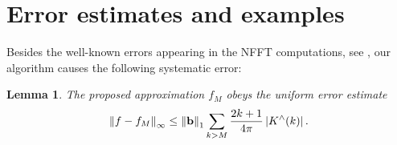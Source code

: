 \documentclass[11pt,a4paper,twoside,bibtotoc]{scrartcl}
\theoremstyle{plain}
\newtheorem{lemma}[theorem]{Lemma}
\theoremstyle{definition}
\theoremstyle{remark}
\newcommand{\abs}[1]{\ensuremath{\left\vert#1\right\vert}}
\newcommand{\fun}[2]{\ensuremath{#1{\hspace{-0.4ex}}\left(#2\right)}}
\newcommand{\mb}[1]{\mathbf{#1}}
\newcommand{\V}[1]{\mb{#1}}
\numberwithin{equation}{section}
\numberwithin{table}{section}
\numberwithin{figure}{section}
\begin{document}
\section{Error estimates and examples}\label{Basics:SphericalKernels}

Besides the well-known errors appearing in the NFFT computations, see
\cite{postta01}, our algorithm causes the following systematic error:
\begin{lemma}\label{lemma:error}
  The proposed approximation $f_{M}$ obeys the uniform error estimate
  \begin{equation*}
    \left\|f - f_{M}\right\|_{\infty} \le \left\|\V{b}\right\|_1 \sum_{k>M}
    \frac{2k+1}{4\pi} \abs{\fun{K^{\wedge}}{k}}.
  \end{equation*}
\end{lemma}
\end{document}
